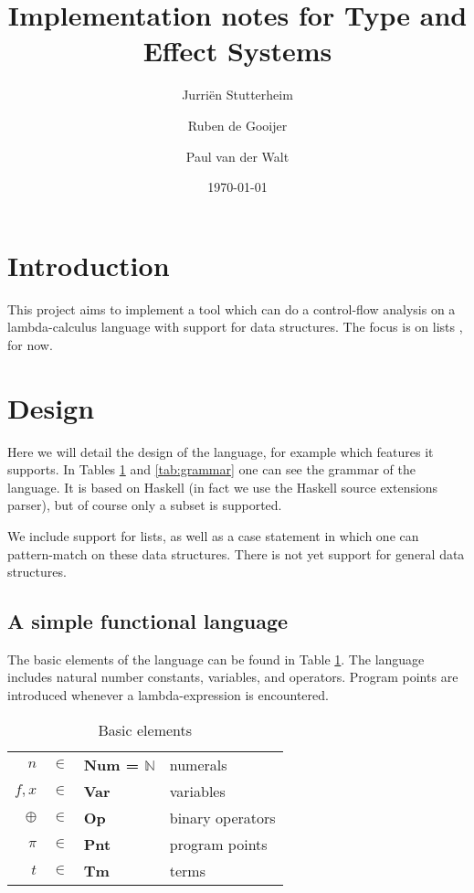 \documentclass[a4paper]{article}
\author{Jurri\"en Stutterheim\and Ruben de Gooijer \and Paul van der Walt}
\date{\today}
\title{Implementation notes for Type and Effect Systems}
\begin{document}
\maketitle \tableofcontents

\section{Introduction}

This project aims to implement a tool which can do a control-flow analysis on a lambda-calculus language with support for
data structures. The focus is on lists%
, for now.

\section{Design}

Here we will detail the design of the language, for example which features it
supports. In Tables \ref{tab:elems} and \ref{tab:grammar} one can see the
grammar of the language. It is based on Haskell (in fact we use the Haskell
source extensions parser), but of course only a subset is supported. 

We include support for%
 lists, as well as a case statement in which one
can pattern-match on these data structures. There is not yet support for general
data structures.

\subsection{A simple functional language}


The basic elements of the language can be found in Table \ref{tab:elems}. The
language includes natural number constants, variables, and operators. Program
points are introduced whenever a lambda-expression is encountered.
\begin{table}
    \centering
    \begin{tabular}{rcll}
        $n$ &           $\in$ & \textbf{Num = $\mathds{N}$}& numerals \\
        $f,x$ &         $\in$ & \textbf{Var}               & variables \\
        $\oplus$ &      $\in$ & \textbf{Op}                & binary operators \\
        $\pi$ &         $\in$ & \textbf{Pnt}               & program points  \\
        $t$ &           $\in$ & \textbf{Tm}                & terms \\
    \end{tabular}
    \caption{Basic elements}
    \label{tab:elems}
\end{table}
\end{document}
